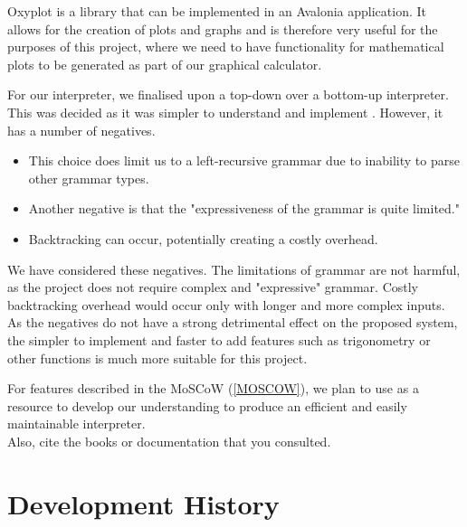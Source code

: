 \documentclass[a4paper, oneside, 11pt]{report}
\begin{document}
    Oxyplot is a library that can be implemented in an Avalonia application. It allows for the creation of plots and graphs and is therefore very useful for the purposes of this project, where we need to have functionality for mathematical plots to be generated as part of our graphical calculator.\newline

    For our interpreter, we finalised upon a top-down over a bottom-up interpreter. This was decided as it was simpler to understand and implement \citep{Top-DownInterpreter}. However, it has a number of negatives.
    \begin{itemize}
        \item This choice does limit us to a left-recursive grammar due to inability to parse other grammar types.
        \item Another negative is that the "expressiveness of the grammar is quite limited."
        \item Backtracking can occur, potentially creating a costly overhead.
    \end{itemize}
    We have considered these negatives. The limitations of grammar are not harmful, as the project does not require complex and "expressive" grammar. Costly backtracking overhead would occur only with longer and more complex inputs. As the negatives do not have a strong detrimental effect on the proposed system, the simpler to implement and faster to add features such as trigonometry or other functions is much more suitable for this project.

    For features described in the MoSCoW (\ref{MOSCOW}), we plan to use \citet{Nystrom:2021} as a resource to develop our understanding to produce an efficient and easily maintainable interpreter. \\


    Also, cite the books \citep{Nystrom:2021} or documentation \citep{WPF:2023} that you consulted.
    \chapter{Development History}\label{Chap:DevHist}
\end{document}
